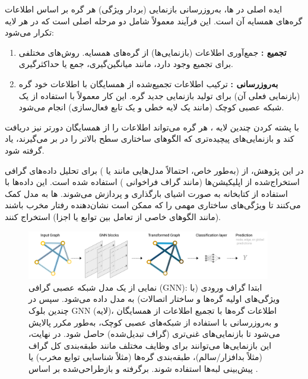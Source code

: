 ایده اصلی در ها، به‌روزرسانی بازنمایی (بردار ویژگی) هر گره بر اساس اطلاعات گره‌های همسایه آن است. این فرآیند معمولاً شامل دو مرحله اصلی است که در هر لایه  تکرار می‌شود:
\begin{enumerate}
    \item \textbf{تجمیع :} جمع‌آوری اطلاعات (بازنمایی‌ها) از گره‌های همسایه. روش‌های مختلفی برای تجمیع وجود دارد، مانند میانگین‌گیری، جمع یا حداکثرگیری.
    \item \textbf{به‌روزرسانی :} ترکیب اطلاعات تجمیع‌شده از همسایگان با اطلاعات خود گره (بازنمایی فعلی آن) برای تولید بازنمایی جدید گره. این کار معمولاً با استفاده از یک شبکه عصبی کوچک (مانند یک لایه خطی و یک تابع فعال‌سازی) انجام می‌شود.
\end{enumerate}
با پشته کردن چندین لایه ، هر گره می‌تواند اطلاعات را از همسایگان دورتر نیز دریافت کند و بازنمایی‌های پیچیده‌تری که الگوهای ساختاری سطح بالاتر را در بر می‌گیرند، یاد گرفته شود.

در این پژوهش، از  (به‌طور خاص، احتمالاً مدل‌هایی مانند  \cite{Kipf2017} یا  \cite{Velickovic2018}) برای تحلیل داده‌های گرافی استخراج‌شده از اپلیکیشن‌ها (مانند گراف فراخوانی ) استفاده شده است. این داده‌ها با استفاده از کتابخانه  به صورت اشیای  بارگذاری و پردازش می‌شوند. ها به مدل کمک می‌کنند تا ویژگی‌های ساختاری مهمی را که ممکن است نشان‌دهنده رفتار مخرب باشند (مانند الگوهای خاصی از تعامل بین توابع یا اجزا) استخراج کنند.

\begin{figure}[!t]
    \centering
    \includegraphics[width=0.95\textwidth]{images/gnn_structure}
    \caption{نمایی از یک مدل شبکه عصبی گرافی (GNN): ابتدا گراف ورودی (با ویژگی‌های اولیه گره‌ها و ساختار اتصالات) به مدل داده می‌شود. سپس در چندین بلوک GNN (لایه)، اطلاعات گره‌ها با تجمیع اطلاعات از همسایگان و به‌روزرسانی با استفاده از شبکه‌های عصبی کوچک، به‌طور مکرر پالایش می‌شود تا بازنمایی‌های غنی‌تری (گراف تبدیل‌شده) حاصل شود. در نهایت، این بازنمایی‌ها می‌توانند برای وظایف مختلف مانند طبقه‌بندی کل گراف (مثلاً بدافزار/سالم)، طبقه‌بندی گره‌ها (مثلاً شناسایی توابع مخرب) یا پیش‌بینی لبه‌ها استفاده شوند. برگرفته و بازطراحی‌شده بر اساس \cite{sanchez-lengeling2021a}.}
    \label{fig:gnn_structure}
\end{figure}

